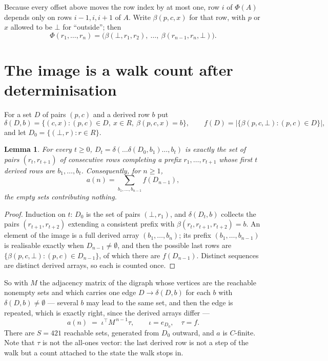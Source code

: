\documentclass[11pt,a4paper]{article}
\theoremstyle{plain}
\newtheorem{lemma}[theorem]{Lemma}
\theoremstyle{definition}
\begin{document}
Because every offset above moves the row index by at most one, row $i$ of
$\Phi(A)$ depends only on rows $i-1,i,i+1$ of $A$. Write $\beta(p,c,x)$ for that row, with $p$
or $x$ allowed to be $\bot$ for ``outside''; then
\[
\Phi(r_1,\dots,r_n)=\bigl(\beta(\bot,r_1,r_2),\ \dots,\ \beta(r_{n-1},r_n,\bot)\bigr).
\]

\section{The image is a walk count after determinisation}

For a set $D$ of pairs $(p,c)$ and a derived row $b$ put
\[
\delta(D,b)=\{(c,x):(p,c)\in D,\ x\in R,\ \beta(p,c,x)=b\},\qquad
f(D)=\bigl|\{\beta(p,c,\bot):(p,c)\in D\}\bigr| ,
\]
and let $D_0=\{(\bot,r):r\in R\}$.

\begin{lemma}\label{lem:det}
For every $t\ge0$, $D_t=\delta(\dots\delta(D_0,b_1)\dots,b_t)$ is exactly the set of pairs
$(r_t,r_{t+1})$ of consecutive rows completing a prefix $r_1,\dots,r_{t+1}$ whose first $t$
derived rows are $b_1,\dots,b_t$. Consequently, for $n\ge1$,
\[
a(n)=\sum_{b_1,\dots,b_{n-1}}f(D_{n-1}),
\]
the empty sets contributing nothing.
\end{lemma}

\begin{proof}
Induction on $t$: $D_0$ is the set of pairs $(\bot,r_1)$, and $\delta(D_t,b)$ collects the
pairs $(r_{t+1},r_{t+2})$ extending a consistent prefix with
$\beta(r_t,r_{t+1},r_{t+2})=b$. An element of the image is a full derived array
$(b_1,\dots,b_n)$; its prefix $(b_1,\dots,b_{n-1})$ is realisable exactly when
$D_{n-1}\neq\emptyset$, and then the possible last rows are
$\{\beta(p,c,\bot):(p,c)\in D_{n-1}\}$, of which there are $f(D_{n-1})$. Distinct sequences
are distinct derived arrays, so each is counted once.
\end{proof}

So with $M$ the adjacency matrix of the digraph whose vertices are the reachable nonempty sets
and which carries one edge $D\to\delta(D,b)$ for each $b$ with $\delta(D,b)\neq\emptyset$ ---
several $b$ may lead to the same set, and then the edge is repeated, which is exactly right,
since the derived arrays differ ---
\[
a(n)\;=\;\iota^{\!\top}M^{\,n-1}\tau,\qquad \iota=e_{D_0},\quad \tau=f .
\]
There are $S=421$ reachable sets, generated from $D_0$ outward, and $a$ is $C$-finite.
Note that $\tau$ is not the all-ones vector: the last derived row is not a
step of the walk but a count attached to the state the walk stops in.
\end{document}
